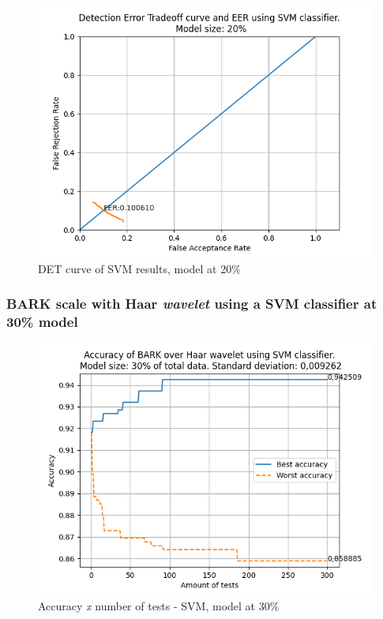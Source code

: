			\begin{figure}[H]
				\centering
				\includegraphics[scale=.6]{images/results/det/DET_SVM_20}
				\caption{DET curve of SVM results, model at 20\%}
				\label{fig:detsvm20}
			\end{figure}
		
			
		
		\subsubsection{BARK scale with Haar \textit{wavelet} using a SVM classifier at 30\% model}			
			\begin{figure}[H]
				\centering
				\includegraphics[scale=.6]{images/results/confusionMatrices/classifier_SVM_30.png}
				\caption{Accuracy \textit{x} number of tests - SVM, model at 30\%}
				\label{fig:classifiersvm30}
			\end{figure}
			
